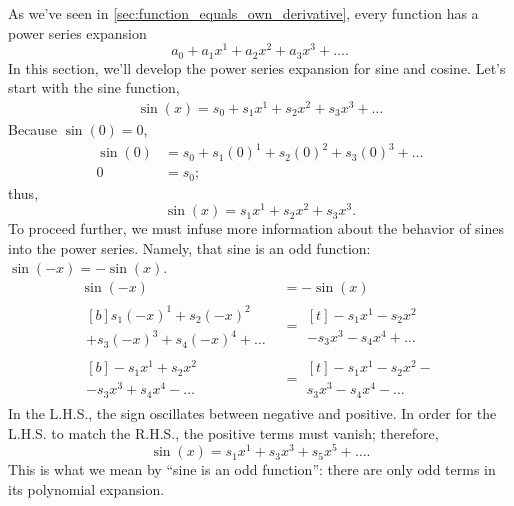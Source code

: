 As we've seen in \cref{sec:function_equals_own_derivative}, every function has a power series expansion
\begin{equation}
    a_0 + a_1x^1 + a_2x^2 + a_3x^3 + \dots.
\end{equation}
In this section, we'll develop the power series expansion for sine and cosine. Let's start with the sine function,
\begin{align}
	\sin(x) = s_0 + s_1x^1 + s_2x^2 + s_3x^3 + \dots
\end{align}
Because $\sin(0) = 0$,
\begin{align}
	\sin(0) &= s_0 + s_1(0)^1 + s_2(0)^2 + s_3(0)^3 + \dots \\
	0 &= s_0;
\end{align}
thus,
\begin{equation}
	\sin(x) = s_1x^1 + s_2x^2 + s_3x^3.
\end{equation}
To proceed further, we must infuse more information about the behavior of sines into the power series. Namely, that sine is an odd function: $\sin(-x) = -\sin(x)$.
\begin{align}
	\sin(-x) &= -\sin(x) \\
	\begin{multlined}[b]
		s_1(-x)^1 + s_2(-x)^2 \\
		+ s_3(-x)^3 + s_4(-x)^4 + \dots
	\end{multlined} &=
	\begin{multlined}[t]
		-s_1x^1 - s_2x^2 \\
		- s_3x^3 - s_4x^4 + \dots 
	\end{multlined} \\
	\begin{multlined}[b]
		-s_1x^1 + s_2x^2 \\
		- s_3x^3 + s_4x^4 - \dots
	\end{multlined} &=
	\begin{multlined}[t]
		-s_1x^1 - s_2x^2 - \\
		s_3x^3 - s_4x^4 - \dots
	\end{multlined}
\end{align}
In the L.H.S., the sign oscillates between negative and positive. In order for the L.H.S. to match the R.H.S., the positive terms must vanish; therefore,
\begin{equation}
	\sin(x) = s_1x^1 + s_3x^3 + s_5x^5 + \dots.
\end{equation}
This is what we mean by \enquote{sine is an odd function}: there are only odd terms in its polynomial expansion.

